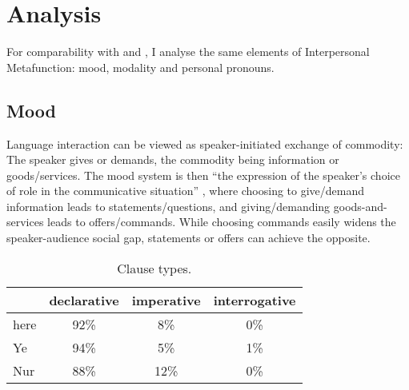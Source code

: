 \documentclass[11pt]{article}
\begin{document}
\section{Analysis}{
	For comparability with \citeauthor{Nur} and \citeauthor{Ye}, I analyse the same elements of Interpersonal Metafunction: mood, modality and personal pronouns.
 	
 	\subsection{Mood}{
 		Language interaction can be viewed as speaker-initiated exchange of commodity: The speaker gives or demands, the commodity being information or goods/services.
 		The mood system is then ``the expression of the speaker's choice of role in the communicative situation'' \citep{Halliday1970ModalityMood}, where choosing to give/demand information leads to statements/questions, and giving/demanding goods-and-services leads to offers/commands. While choosing commands easily widens the speaker-audience social gap, statements or offers can achieve the opposite.

		\begin{table}[h!tb]
	      \centering
			\begin{tabular}{l|ccc}
			         & declarative & imperative & interrogative \\
			  \hline
			  \hline
			  here   & 92\%        & 8\%        & 0\% \\
			  \hline
			  Ye     & 94\%        & 5\%        & 1\% \\
			  Nur    & 88\%        & 12\%       & 0\% \\
			\end{tabular}
	      \caption{Clause types.}
	      \label{tab:mood}
	    \end{table}

}}
\end{document}
